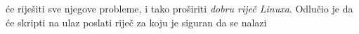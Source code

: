 \documentclass{exam}
\begin{document}
                                                                                            će
                                                                                            riješiti
                                                                                            sve
                                                                                            njegove
                                                                                            probleme,
                                                                                            i
                                                                                            tako
                                                                                            proširiti
                                                                                            \textit{dobru
                                                                                            riječ
                                                                                            Linuxa}.
                                                                                            Odlučio
                                                                                            je
                                                                                            da
                                                                                            će
                                                                                            skripti
                                                                                            na
                                                                                            ulaz
                                                                                            poslati
                                                                                            riječ
                                                                                            za
                                                                                            koju
                                                                                            je
                                                                                            siguran
                                                                                            da
                                                                                            se
                                                                                            nalazi
\end{document}
